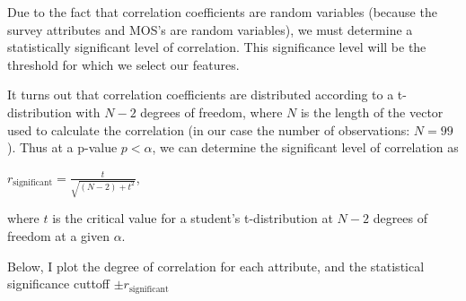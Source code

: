 \documentclass{article}
\begin{document}
    Due to the fact that correlation coefficients are random variables
(because the survey attributes and MOS's are random variables), we must
determine a statistically significant level of correlation. This
significance level will be the threshold for which we select our
features.

It turns out that correlation coefficients are distributed according to
a t-distribution with $N-2$ degrees of freedom, where $N$ is the length
of the vector used to calculate the correlation (in our case the number
of observations: $N=99$). Thus at a p-value $p<\alpha$, we can determine
the significant level of correlation as

$r_{\text{significant}} = \frac{t}{\sqrt{(N-2) + t^2}}$,

where $t$ is the critical value for a student's t-distribution at $N-2$
degrees of freedom at a given $\alpha$.

Below, I plot the degree of correlation for each attribute, and the
statistical significance cuttoff $\pm r_{\text{significant}}$
\end{document}
